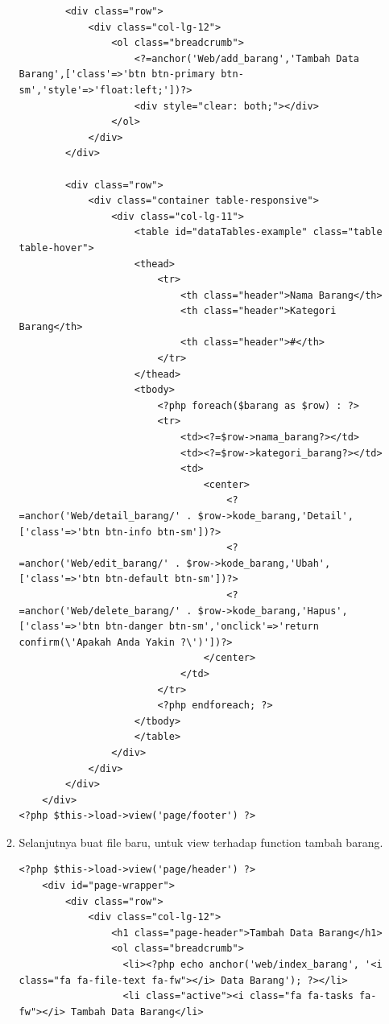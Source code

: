 \begin{enumerate}
\begin{enumerate}
\begin{lstlisting}
        <div class="row">
            <div class="col-lg-12">
                <ol class="breadcrumb">
                    <?=anchor('Web/add_barang','Tambah Data Barang',['class'=>'btn btn-primary btn-sm','style'=>'float:left;'])?>
                    <div style="clear: both;"></div>
                </ol>
            </div>
        </div>

        <div class="row">
            <div class="container table-responsive">
                <div class="col-lg-11">
                    <table id="dataTables-example" class="table table-hover">
                    <thead>
                        <tr>
                            <th class="header">Nama Barang</th>
                            <th class="header">Kategori Barang</th>
                            <th class="header">#</th>
                        </tr>
                    </thead>
                    <tbody>
                        <?php foreach($barang as $row) : ?> 
                        <tr>
                            <td><?=$row->nama_barang?></td>
                            <td><?=$row->kategori_barang?></td>
                            <td>
                                <center>
                                    <?=anchor('Web/detail_barang/' . $row->kode_barang,'Detail',['class'=>'btn btn-info btn-sm'])?>
                                    <?=anchor('Web/edit_barang/' . $row->kode_barang,'Ubah',['class'=>'btn btn-default btn-sm'])?>
                                    <?=anchor('Web/delete_barang/' . $row->kode_barang,'Hapus',['class'=>'btn btn-danger btn-sm','onclick'=>'return confirm(\'Apakah Anda Yakin ?\')'])?>
                                </center>
                            </td>
                        </tr>
                        <?php endforeach; ?>
                    </tbody>
                    </table>
                </div>
            </div>
        </div>
    </div>
<?php $this->load->view('page/footer') ?>
\end{lstlisting}
    		
    	\item Selanjutnya buat file baru, untuk view terhadap function tambah barang.
\begin{lstlisting}
<?php $this->load->view('page/header') ?>
    <div id="page-wrapper">
        <div class="row">
            <div class="col-lg-12">
                <h1 class="page-header">Tambah Data Barang</h1>
                <ol class="breadcrumb">
                  <li><?php echo anchor('web/index_barang', '<i class="fa fa-file-text fa-fw"></i> Data Barang'); ?></li>
                  <li class="active"><i class="fa fa-tasks fa-fw"></i> Tambah Data Barang</li>
                  

\end{lstlisting}
\end{enumerate}
\end{enumerate}

